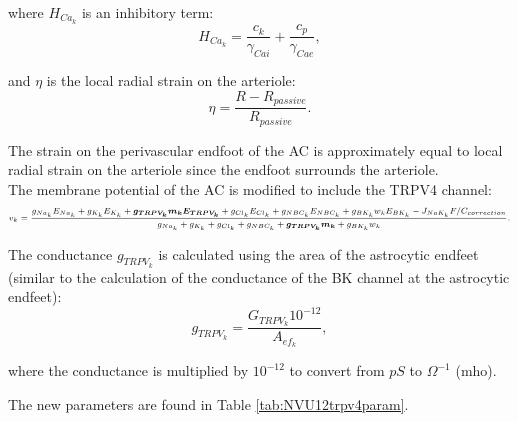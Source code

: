 	where $H_{Ca_k}$ is an inhibitory term:
		\begin{equation}
		H_{Ca_k} = \frac{c_k}{\gamma_{Cai}} + \frac{c_p}{\gamma_{Cae}},
		\end{equation}
	
	and $\eta$ is the local radial strain on the arteriole:
		\begin{equation}
		\eta = \frac{R - R_{passive}}{R_{passive}}.
		\end{equation}
	
	The strain on the perivascular endfoot of the AC is approximately equal to local radial strain on the arteriole since the endfoot surrounds the arteriole.	
	\\
	
	The membrane potential of the AC is modified to include the TRPV4 channel:
		\begin{equation}
		\centering
		\scriptsize{
		v_k = \frac{g_{Na_k} E_{Na_k} + g_{K_k} E_{K_k} + \bm{g_{TRPV_k} m_k E_{TRPV_k}} + 
	        g_{Cl_k} E_{Cl_k} + g_{NBC_k} E_{NBC_k} + 		                g_{BK_k} w_k E_{BK_k} - 
	        J_{NaK_k} F / C_{correction}}{ g_{Na_k} + g_{K_k} + g_{Cl_k} + g_{NBC_k} + \bm{ g_{TRPV_k} m_k } + g_{BK_k} w_k }.
	   }
		\end{equation}
	
	The conductance $g_{TRPV_k}$ is calculated using the area of the astrocytic endfeet (similar to the calculation of the conductance of the BK channel at the astrocytic endfeet):
		\begin{equation}
		g_{TRPV_k} = \frac{G_{TRPV_k} 10^{-12}}{A_{ef_k}},
		\end{equation}
	
	where the conductance is multiplied by $10^{-12}$ to convert from $pS$ to $\Omega^{-1}$ (mho).
	
	The new parameters are found in Table \ref{tab:NVU12trpv4param}. 
	
